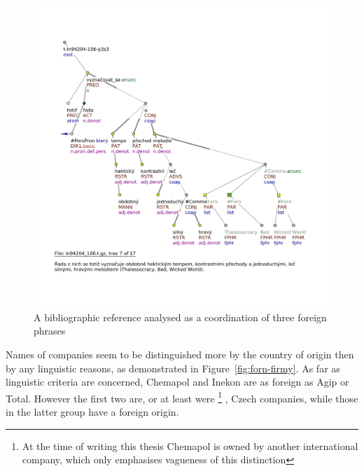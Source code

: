 \documentclass[11pt, a4paper]{article}
\begin{document}
\begin{figure}[h]
\includegraphics[width=\textwidth]{images/vyhledavky/forn-coord1x-biblio.pdf}
\caption{A bibliographic reference analysed as a coordination of three foreign phrases}
\label{fig:forn-biblio}
\end{figure}

Names of companies seem to be distinguished more by the country of origin then by any linguistic reasons, as demonstrated in Figure~\ref{fig:forn-firmy}. As far as linguistic criteria are concerned, Chemapol and Inekon are as foreign as Agip or Total. However the first two are, or at least were%
\footnote{At the time of writing this thesis Chemapol is owned by another international company, which only emphasises vagueness of this distinction} %
%
, Czech companies, while those in the latter group have a foreign origin.
\end{document}

